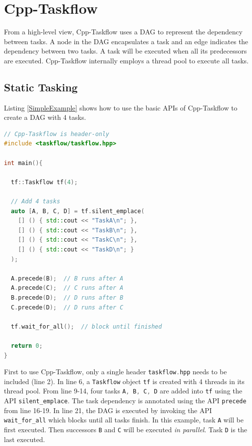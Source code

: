 \documentclass[sigconf]{acmart}
\def\codeinline{\lstinline[basicstyle=\normalsize\color{darkgray},language=C++]}
\begin{document}
\section{Cpp-Taskflow}
From a high-level view, Cpp-Taskflow uses a DAG to represent the dependency
between tasks. A node in the DAG encapsulates a task and an edge
indicates the dependency between two tasks.  A task will be executed when all
its predecessors are executed.  Cpp-Taskflow internally employs a thread pool
to execute all tasks. 

\subsection{Static Tasking}
Listing \ref{SimpleExample} shows how to use the basic APIs of Cpp-Taskflow to create a DAG with 4 tasks.

\begin{lstlisting}[language=C++,label=SimpleExample,caption={A simple example.}]
// Cpp-Taskflow is header-only
#include <taskflow/taskflow.hpp>  

int main(){
  
  tf::Taskflow tf(4);

  // Add 4 tasks
  auto [A, B, C, D] = tf.silent_emplace(
    [] () { std::cout << "TaskA\n"; },               
    [] () { std::cout << "TaskB\n"; },               
    [] () { std::cout << "TaskC\n"; },               
    [] () { std::cout << "TaskD\n"; }                
  );                                                 
                                                     
  A.precede(B);  // B runs after A                   
  A.precede(C);  // C runs after A                   
  B.precede(D);  // D runs after B                   
  C.precede(D);  // D runs after C                   
                                                     
  tf.wait_for_all();  // block until finished

  return 0;
}
\end{lstlisting} 

First to use Cpp-Taskflow, only a single header \codeinline{taskflow.hpp} needs
to be included (line 2).  In line 6, a \codeinline{Taskflow} object
\codeinline{tf} is created with 4 threads in its thread pool. From line 9-14,
four tasks \codeinline{A, B, C, D} are added into \codeinline{tf} using the API
\codeinline{silent_emplace}.  The task dependency is annotated using the API
\codeinline{precede} from line 16-19. In line 21, the DAG is executed by
invoking the API \codeinline{wait_for_all} which blocks until all tasks finish.
In this example, task \codeinline{A} will be first executed. Then  successors
\codeinline{B} and \codeinline{C} will be executed \emph{in parallel}. Task
\codeinline{D} is the last executed.
\end{document}
